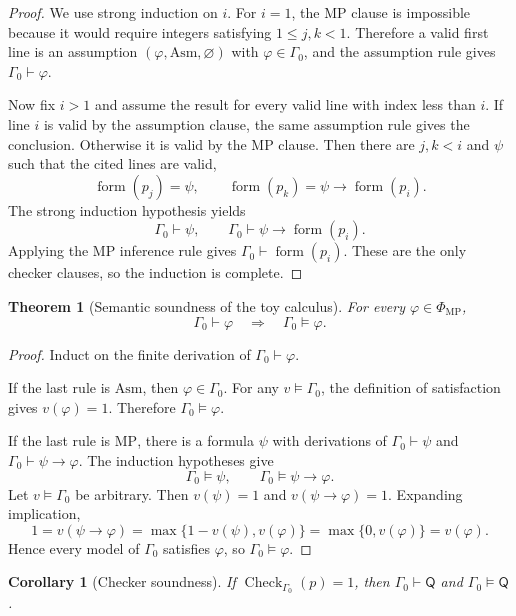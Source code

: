 \documentclass[11pt,oneside]{book}
\newtheorem{theorem}[definition]{Theorem}
\newtheorem{corollary}[definition]{Corollary}
\theoremstyle{remark}
\DeclareMathOperator{\ProofCheck}{Check}
\begin{document}
\begin{proof}
We use strong induction on $i$. For $i=1$, the MP clause is impossible
because it would require integers satisfying $1\le j,k<1$.
Therefore a valid first line is an assumption
$(\varphi,\mathrm{Asm},\varnothing)$ with $\varphi\in\Gamma_0$, and the
assumption rule gives $\Gamma_0\vdash\varphi$.

Now fix $i>1$ and assume the result for every valid line with index less than
$i$. If line $i$ is valid by the assumption clause, the same assumption rule
gives the conclusion. Otherwise it is valid by the MP clause. Then there are
$j,k<i$ and $\psi$ such that the cited lines are valid,
\[
\operatorname{form}(p_j)=\psi,
\qquad
\operatorname{form}(p_k)=\psi\to\operatorname{form}(p_i).
\]
The strong induction hypothesis yields
\[
\Gamma_0\vdash\psi,
\qquad
\Gamma_0\vdash\psi\to\operatorname{form}(p_i).
\]
Applying the MP inference rule gives
$\Gamma_0\vdash\operatorname{form}(p_i)$. These are the only checker clauses,
so the induction is complete.
\end{proof}

\begin{theorem}[Semantic soundness of the toy calculus]
For every $\varphi\in\Phi_{\mathrm{MP}}$,
\[
\Gamma_0\vdash\varphi
\quad\Longrightarrow\quad
\Gamma_0\models\varphi.
\]
\end{theorem}

\begin{proof}
Induct on the finite derivation of $\Gamma_0\vdash\varphi$.

If the last rule is $\mathrm{Asm}$, then $\varphi\in\Gamma_0$. For any
$v\models\Gamma_0$, the definition of satisfaction gives $v(\varphi)=1$.
Therefore $\Gamma_0\models\varphi$.

If the last rule is $\mathrm{MP}$, there is a formula $\psi$ with derivations
of $\Gamma_0\vdash\psi$ and $\Gamma_0\vdash\psi\to\varphi$. The induction
hypotheses give
\[
\Gamma_0\models\psi,
\qquad
\Gamma_0\models\psi\to\varphi.
\]
Let $v\models\Gamma_0$ be arbitrary. Then $v(\psi)=1$ and
$v(\psi\to\varphi)=1$. Expanding implication,
\[
1=v(\psi\to\varphi)
=\max\{1-v(\psi),v(\varphi)\}
=\max\{0,v(\varphi)\}
=v(\varphi).
\]
Hence every model of $\Gamma_0$ satisfies $\varphi$, so
$\Gamma_0\models\varphi$.
\end{proof}

\begin{corollary}[Checker soundness]
If $\ProofCheck_{\Gamma_0}(p)=1$, then
$\Gamma_0\vdash\mathsf Q$ and $\Gamma_0\models\mathsf Q$.
\end{corollary}
\end{document}
